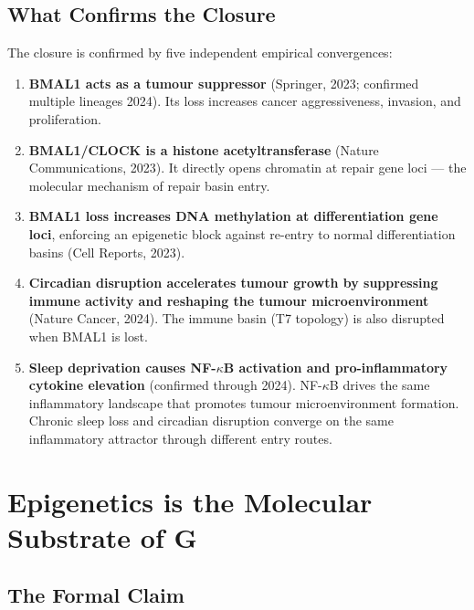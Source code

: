 \documentclass[10pt, a4paper]{article}
\begin{document}
\subsection{What Confirms the Closure}

The closure is confirmed by five
independent empirical convergences:

\begin{enumerate}[itemsep=0.3em]
  \item \textbf{BMAL1 acts as a tumour
    suppressor} (Springer, 2023;
    confirmed multiple lineages 2024).
    Its loss increases cancer
    aggressiveness, invasion, and
    proliferation.

  \item \textbf{BMAL1/CLOCK is a histone
    acetyltransferase} (Nature
    Communications, 2023). It directly
    opens chromatin at repair gene
    loci --- the molecular mechanism
    of repair basin entry.

  \item \textbf{BMAL1 loss increases
    DNA methylation at differentiation
    gene loci}, enforcing an epigenetic
    block against re-entry to normal
    differentiation basins (Cell
    Reports, 2023).

  \item \textbf{Circadian disruption
    accelerates tumour growth by
    suppressing immune activity and
    reshaping the tumour
    microenvironment} (Nature Cancer,
    2024). The immune basin (T7 topology)
    is also disrupted when BMAL1
    is lost.

  \item \textbf{Sleep deprivation causes
    NF-$\kappa$B activation and
    pro-inflammatory cytokine elevation}
    (confirmed through 2024). NF-$\kappa$B
    drives the same inflammatory
    landscape that promotes tumour
    microenvironment formation. Chronic
    sleep loss and circadian disruption
    converge on the same inflammatory
    attractor through different
    entry routes.
\end{enumerate}

\section{Epigenetics is the Molecular
Substrate of G}
\label{sec:epigenetics}

\subsection{The Formal Claim}
\end{document}
